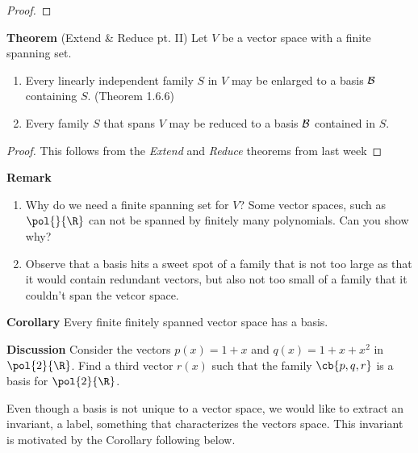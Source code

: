 \documentclass[letterpaper, 10pt]{article}
\begin{document}
\begin{proof}
\end{proof}





\lb
\textbf{Theorem}  (Extend \& Reduce pt. II)
\lb
Let $V$ be a vector space with a finite spanning set.
\begin{enumerate}
    \item 
        Every linearly independent family $S$ in $V$ may be enlarged to
        a basis $\cal B$ containing $S$. (Theorem 1.6.6)
    \item
        Every family $S$ that spans $V$ may be reduced to a basis $\cal B$ contained in $S$.
\end{enumerate}

\begin{proof}
This follows from the \emph{Extend} and \emph{Reduce} theorems from last week
\end{proof}



\lb
\textbf{Remark}
\begin{enumerate}
    \item 
        Why do we need a finite spanning set for $V$? Some vector spaces, such as
        $\pol{}{\R}$ can not be spanned by finitely many polynomials.
        Can you show why?
    \item
        Observe that a basis hits a sweet spot of a family that is not too
        large as that it would contain redundant vectors, but also not too
        small of a family that it couldn't span the vetcor space.
\end{enumerate}






\lb
\textbf{Corollary}
\lb
Every finite finitely spanned vector space has a basis.





\lb
\textbf{Discussion}
\lb
Consider the vectors $p(x) = 1 + x$ and $q(x) = 1 + x + x^2$ in $\pol{2}{\R}$.
Find a third vector $r(x)$ such that the family $\cb{p, q, r}$ is a basis for $\pol{2}{\R}$.







\newpage
\lb
Even though a basis is not unique to a vector space, we would like to extract
an invariant, a label, something that characterizes the vectors space.
This invariant is motivated by the Corollary following below.
\end{document}
